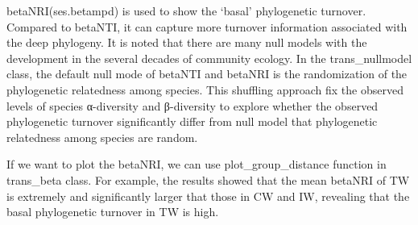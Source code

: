 \documentclass[
]{book}
\newenvironment{Shaded}{\begin{snugshade}}{\end{snugshade}}
\newcommand{\AttributeTok}[1]{\textcolor[rgb]{0.77,0.63,0.00}{#1}}
\newcommand{\CommentTok}[1]{\textcolor[rgb]{0.56,0.35,0.01}{\textit{#1}}}
\newcommand{\ConstantTok}[1]{\textcolor[rgb]{0.00,0.00,0.00}{#1}}
\newcommand{\DecValTok}[1]{\textcolor[rgb]{0.00,0.00,0.81}{#1}}
\newcommand{\FunctionTok}[1]{\textcolor[rgb]{0.00,0.00,0.00}{#1}}
\newcommand{\NormalTok}[1]{#1}
\newcommand{\OtherTok}[1]{\textcolor[rgb]{0.56,0.35,0.01}{#1}}
\newcommand{\SpecialCharTok}[1]{\textcolor[rgb]{0.00,0.00,0.00}{#1}}
\newcommand{\StringTok}[1]{\textcolor[rgb]{0.31,0.60,0.02}{#1}}
\begin{document}
betaNRI(ses.betampd) is used to show the `basal' phylogenetic turnover\citep{Liu_Long_term_2017}.
Compared to betaNTI, it can capture more turnover information associated with the deep phylogeny.
It is noted that there are many null models with the development in the several decades of community ecology.
In the trans\_nullmodel class,
the default null mode of betaNTI and betaNRI is the randomization of the phylogenetic relatedness among species.
This shuffling approach fix the observed levels of species α-diversity and β-diversity to
explore whether the observed phylogenetic turnover significantly differ from null model that phylogenetic relatedness among species are random.

\begin{Shaded}
\end{Shaded}

If we want to plot the betaNRI, we can use plot\_group\_distance function in trans\_beta class.
For example, the results showed that the mean betaNRI of TW is extremely and significantly larger that those in CW and IW,
revealing that the basal phylogenetic turnover in TW is high.

\begin{Shaded}
\end{Shaded}
\end{document}
